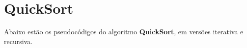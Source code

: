 \section{QuickSort}
Abaixo estão os pseudocódigos do algoritmo \textbf{QuickSort}, em versões iterativa e recursiva.



